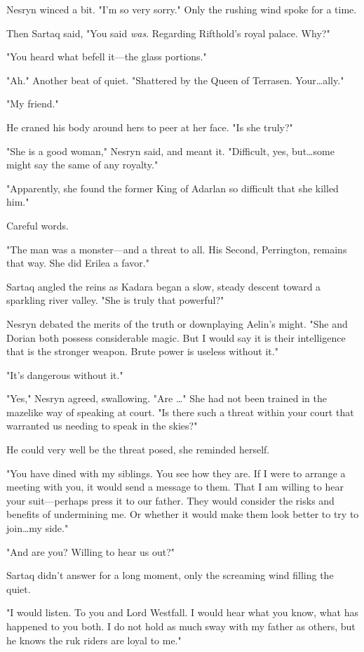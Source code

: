 Nesryn winced a bit.
"I'm so very sorry."
Only the rushing wind spoke for a time.

Then Sartaq said, "You said \emph{was}.
Regarding Rifthold's royal palace.
Why?"

"You heard what befell it---the glass portions."

"Ah."
Another beat of quiet.
"Shattered by the Queen of Terrasen.
Your\ldots ally."

"My friend."

He craned his body around hers to peer at her face.
"Is she truly?"

"She is a good woman," Nesryn said, and meant it.
"Difficult, yes, but\ldots some might say the same of any royalty."

"Apparently, she found the former King of Adarlan so difficult that she killed him."

Careful words.

"The man was a monster---and a threat to all.
His Second, Perrington, remains that way.
She did Erilea a favor."

Sartaq angled the reins as Kadara began a slow, steady descent toward a sparkling river valley.
"She is truly that powerful?"

Nesryn debated the merits of the truth or downplaying Aelin's might.
"She and Dorian both possess considerable magic.
But I would say it is their intelligence that is the stronger weapon.
Brute power is useless without it."

"It's dangerous without it."

"Yes," Nesryn agreed, swallowing.
"Are \ldots" She had not been trained in the mazelike way of speaking at court.
"Is there such a threat within your court that warranted us needing to speak in the skies?"

He could very well be the threat posed, she reminded herself.

"You have dined with my siblings.
You see how they are.
If I were to arrange a meeting with you, it would send a message to them.
That I am willing to hear your suit---perhaps press it to our father.
They would consider the risks and benefits of undermining me.
Or whether it would make them look better to try to join\ldots my side."

"And are you?
Willing to hear us out?"

Sartaq didn't answer for a long moment, only the screaming wind filling the quiet.

"I would listen.
To you and Lord Westfall.
I would hear what you know, what has happened to you both.
I do not hold as much sway with my father as others, but he knows the ruk riders are loyal to me."

